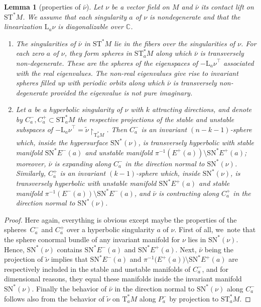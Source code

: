\documentclass[10pt]{amsart}
\newenvironment{enumeratea}
{\bgroup\def\theenumi{\alph{enumi}}\begin{enumerate}}
{\end{enumerate}\egroup}
\newcommand{\C}{{\mathbb C}}
\newcommand{\tu}[1]{\textup{#1}}
\newcommand{\sSN}{\mathrm{SN}^\ast}
\newcommand{\sT}{\mathrm{T}^\ast}
\newcommand{\sST}{\mathrm{ST}^\ast}
\newcommand{\hnu}{\tilde\nu}
\newcommand{\cnu}{\bar\nu}
\def\Lnu_#1{{\mathrm L_#1\nu}}
\newcommand{\rst}[1]{{\upharpoonright}_{\!#1}}
\theoremstyle{plain}
\newtheorem{lemma}[theorem]{Lemma}
\theoremstyle{definition}
\begin{document}
\begin{lemma}[properties of $\cnu$] \label{l:cnu}
Let $\nu$ be a vector field on $M$ and $\cnu$ its contact lift on $\sST M$. We
assume that each singularity $a$ of $\nu$ is nondegenerate and that the
linearization $\Lnu_a$ is diagonalizable over $\C$.
\begin{enumeratea}
\item\label{l:cnua}
The singularities of $\cnu$ in $\sST M$ lie in the fibers over the singularities
of $\nu$. For each zero $a$ of $\nu$, they form spheres in $\sST_aM$ along which
$\cnu$ is transversely non-degenerate. These are the spheres of the eigenspaces
of $-\Lnu_a^\top$ associated with the real eigenvalues. The non-real eigenvalues
give rise to invariant spheres filled up with periodic orbits along which $\cnu$
is transversely non-degenerate provided the eigenvalue is not pure imaginary.

\item\label{l:cnub}
Let $a$ be a hyperbolic singularity of $\nu$ with $k$ attracting directions, and
denote by $C_a^-,C_a^+ \subset \sST_aM$ the respective projections of the stable
and unstable subspaces of $-\Lnu_a^\top = \hnu \rst{ \sT_aM }$. Then $C_a^-$ is
an invariant $(n-k-1)$-sphere which, inside the hypersurface $\sSN(\nu)$, is
transversely hyperbolic with stable manifold $\sSN E^-(a)$ and unstable manifold
$\pi^{-1}(E^+(a)) \setminus \sSN E^+(a)$\tu; moreover, $\cnu$ is expanding along $C_a^-$
in the direction normal to $\sSN(\nu)$. Similarly, $C_a^+$ is an invariant
$(k-1)$-sphere which, inside $\sSN(\nu)$, is transversely hyperbolic with
unstable manifold $\sSN E^+(a)$ and stable manifold $\pi^{-1}(E^-(a)) \setminus\sSN
E^-(a)$, and $\cnu$ is contracting along $C_a^+$ in the direction normal to
$\sSN(\nu)$.
\end{enumeratea}
\end{lemma}

\begin{proof}
Here again, everything is obvious except maybe the properties of the spheres~$C_a^-$ and $C_a^+$ over a hyperbolic singularity $a$ of $\nu$. First of all, we~note that the sphere conormal bundle of any invariant manifold for $\nu$ lies in
$\sSN(\nu)$. Hence, $\sSN(\nu)$ contains $\sSN E^-(a)$ and $\sSN E^+(a)$. Next,
$\cnu$ being the projection of $\hnu$ implies that $\sSN E^-(a)$ and $\pi^{-1}
\bigl(E^+(a)\bigr) \setminus \sSN E^+(a)$ are respectively included in the stable and
unstable manifolds of $C_a^-$, and for dimensional reasons, they equal these
manifolds inside the invariant manifold $\sSN(\nu)$. Finally the behavior of
$\cnu$ in the direction normal to $\sSN(\nu)$ along $C_a^-$ follows also from
the behavior of $\hnu$ on $\sT_aM$ along $P_a^-$ by projection to $\sST_aM$.
\end{proof}
\end{document}

